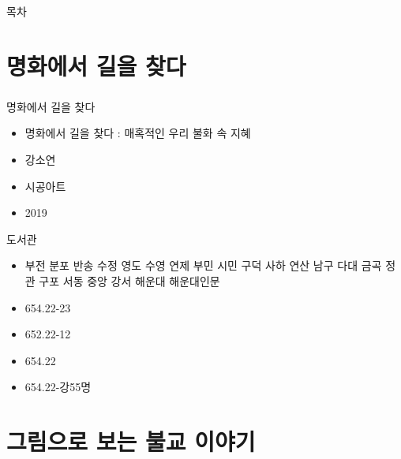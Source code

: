 \documentclass[aspectratio=1610,17pt,xcolor=pdftex,dvipsnames,table,handout]{beamer}
\begin{document}
		\begin{frame} [plain]{목차}
		\tableofcontents%
		\end{frame}
		



		\section{ 명화에서 길을 찾다 }

		\begin{frame} [t,plain]
		\frametitle{}

			\begin{block} { 명화에서 길을 찾다 }
			\setlength{\leftmargini}{4em}			
			\begin{itemize}
				\item [제목]  	명화에서 길을 찾다 : 매혹적인 우리 불화 속 지혜
				\item [지은이]	강소연
				\item [출판사]	시공아트	
				\item [출판일]	2019
			\end{itemize}
			\end{block}						

			\begin{block} {도서관}
			\setlength{\leftmargini}{4em}			
			\begin{itemize}
				\item [도서관]	부전 분포 반송 수정 영도 수영 연제 부민 시민 구덕 사하 연산 남구 다대 금곡 정관 구포 서동 중앙 강서 해운대 해운대인문
				\item [중앙]		654.22-23
				\item [수정]		652.22-12
				\item [구덕]		654.22
				\item [남구]		654.22-강55명 

			\end{itemize}
			\end{block}						

		\end{frame}						
		


		\section{ 그림으로 보는 불교 이야기 }
\end{document}
